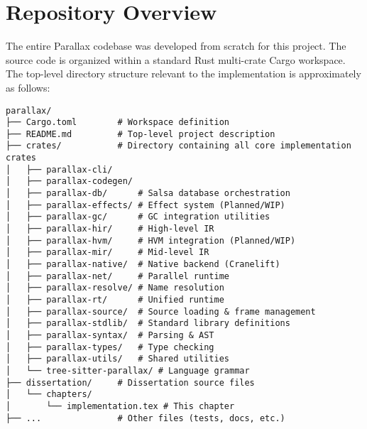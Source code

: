 \section{Repository Overview}
The entire Parallax codebase was developed from scratch for this project. The source code is organized within a standard Rust multi-crate Cargo workspace. The top-level directory structure relevant to the implementation is approximately as follows:

\begin{verbatim}
parallax/
├── Cargo.toml        # Workspace definition
├── README.md         # Top-level project description
├── crates/           # Directory containing all core implementation crates
│   ├── parallax-cli/
│   ├── parallax-codegen/
│   ├── parallax-db/      # Salsa database orchestration
│   ├── parallax-effects/ # Effect system (Planned/WIP)
│   ├── parallax-gc/      # GC integration utilities
│   ├── parallax-hir/     # High-level IR
│   ├── parallax-hvm/     # HVM integration (Planned/WIP)
│   ├── parallax-mir/     # Mid-level IR
│   ├── parallax-native/  # Native backend (Cranelift)
│   ├── parallax-net/     # Parallel runtime
│   ├── parallax-resolve/ # Name resolution
│   ├── parallax-rt/      # Unified runtime
│   ├── parallax-source/  # Source loading & frame management
│   ├── parallax-stdlib/  # Standard library definitions
│   ├── parallax-syntax/  # Parsing & AST
│   ├── parallax-types/   # Type checking
│   ├── parallax-utils/   # Shared utilities
│   └── tree-sitter-parallax/ # Language grammar
├── dissertation/     # Dissertation source files
│   └── chapters/
│       └── implementation.tex # This chapter
├── ...               # Other files (tests, docs, etc.)
\end{verbatim}

